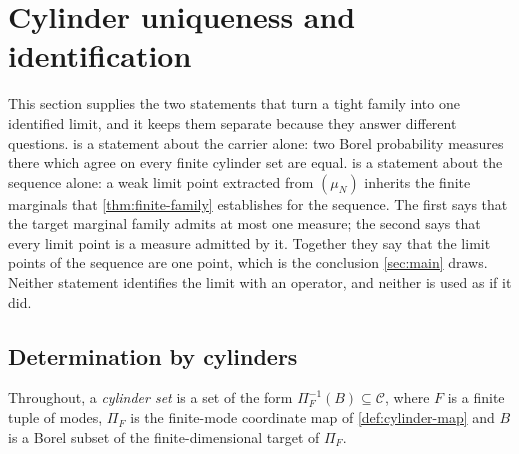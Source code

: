 %
\section{Cylinder uniqueness and identification}\label{sec:identification}

This section supplies the two statements that turn a tight family into one
identified limit, and it keeps them separate because they answer different
questions.  is a statement about the carrier
alone: two Borel probability measures there which agree on every finite cylinder
set are equal.  is a statement about the
sequence alone: a weak limit point extracted from $(\mu_N)$ inherits the finite
marginals that \cref{thm:finite-family} establishes for the sequence. The first
says that the target marginal family admits at most one measure; the second says
that every limit point is a measure admitted by it. Together they say that the
limit points of the sequence are one point, which is the conclusion
\cref{sec:main} draws. Neither statement identifies the limit with an operator,
and neither is used as if it did.

\subsection{Determination by cylinders}

Throughout, a \emph{cylinder set} is a set of the form
$\Pi_F^{-1}(B)\subseteq\mathcal C$, where $F$ is a finite tuple of modes,
$\Pi_F$ is the finite-mode coordinate map of \cref{def:cylinder-map} and
$B$ is a Borel subset of the finite-dimensional target of $\Pi_F$.


